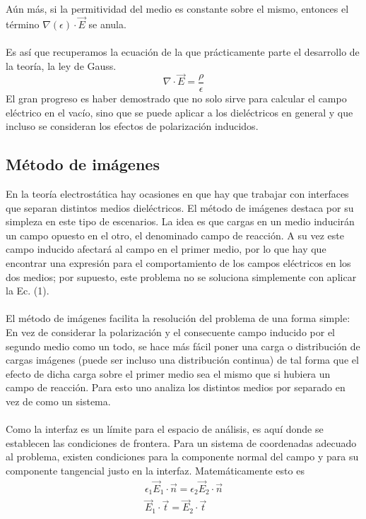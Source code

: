 \documentclass[12pt, notitlepage]{article}
\begin{document}
Aún más, si la permitividad del medio es constante sobre el mismo, entonces el término $\nabla (\epsilon)\cdot\vec{E}$ se anula.\\\\
Es así que recuperamos la ecuación de la que prácticamente parte el desarrollo de la teoría, la ley de Gauss.
\begin{equation}
\nabla\cdot\vec{E} = \frac{\rho}{\epsilon}
\end{equation}
El gran progreso es haber demostrado que no solo sirve para calcular el campo eléctrico en el vacío, sino que se puede aplicar a los dieléctricos en general y que incluso se consideran los efectos de polarización inducidos.

\subsection{Método de imágenes}
En la teoría electrostática hay ocasiones en que hay que trabajar con interfaces que separan distintos medios dieléctricos. El método de imágenes destaca por su simpleza en este tipo de escenarios. La idea es que cargas en un medio inducirán un campo opuesto en el otro, el denominado campo de reacción. A su vez este campo inducido afectará al campo en el primer medio, por lo que hay que encontrar una expresión para el comportamiento de los campos eléctricos en los dos medios; por supuesto, este problema no se soluciona simplemente con aplicar la Ec. (1).\\\\
El método de imágenes facilita la resolución del problema de una forma simple: En vez de considerar la polarización y el consecuente campo inducido por el segundo medio como un todo, se hace más fácil poner una carga o distribución de cargas imágenes (puede ser incluso una distribución continua) de tal forma que el efecto de dicha carga sobre el primer medio sea el mismo que si hubiera un campo de reacción. Para esto uno analiza los distintos medios por separado en vez de como un sistema.\\\\
Como la interfaz es un límite para el espacio de análisis, es aquí donde se establecen las condiciones de frontera. Para un sistema de coordenadas adecuado al problema, existen condiciones para la componente normal del campo y para su componente tangencial justo en la interfaz. Matemáticamente esto es
\begin{gather}
\epsilon_1\vec{E}_1\cdot\vec{n} = \epsilon_2\vec{E}_2\cdot\vec{n}\\
\vec{E}_1\cdot\vec{t} = \vec{E}_2\cdot\vec{t}
\end{gather}
\end{document}
